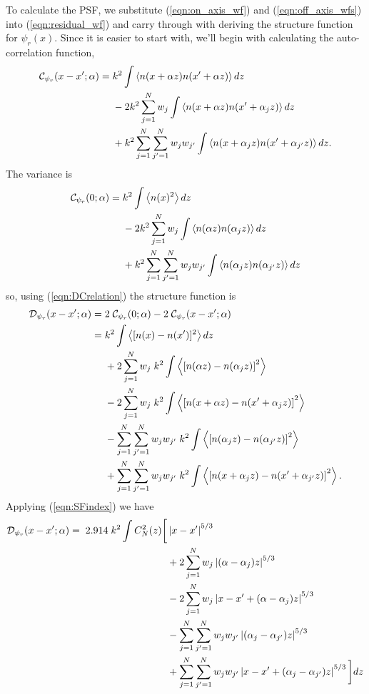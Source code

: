 \documentclass[11pt, oneside]{article}   	%
\begin{document}
To calculate the PSF, we substitute (\ref{eqn:on_axis_wf}) and (\ref{eqn:off_axis_wfs}) into (\ref{eqn:residual_wf}) and carry through with deriving the structure function for $\psi_r(x)$. Since it is easier to start with, we'll begin with calculating the auto-correlation function,
\begin{align}
\label{eqn:16}
{\cal C}_{\psi_r}(x-x';\alpha) =\; &k^2 \int \left< n(x+\alpha z) n(x'+\alpha z) \right > dz \nonumber \\
&- 2 k^2 \sum_{j=1}^N w_j \int \left < n(x+\alpha z) n(x' + \alpha_j z) \right > dz \nonumber \\ 
 &+ k^2  \sum_{j=1}^N \sum_{j'=1}^N w_j w_{j'} \int \left < n(x+\alpha_j z) n(x'+\alpha_{j'} z) \right > dz .
\end{align}
The variance is
\begin{align}
\label{eqn:variance}
{\cal C}_{\psi_r}(0;\alpha) = \;&k^2 \int \left< n(x)^2 \right > dz  \nonumber \\
&- 2 k^2 \sum_{j=1}^N w_j \int \left < n(\alpha z) n(\alpha_j z) \right > dz \nonumber \\ 
 &+ k^2  \sum_{j=1}^N \sum_{j'=1}^N  w_j w_{j'} \int \left < n(\alpha_j z) n(\alpha_{j'} z) \right > dz 
\end{align}
so, using (\ref{eqn:DCrelation}) the structure function is
\begin{align}
{\cal D}_{\psi_r}(x-x';\alpha) =\; &2\; {\cal C}_{\psi_r}(0;\alpha) - 2 \;{\cal C}_{\psi_r}(x-x';\alpha) \nonumber \\
= \;& k^2 \int \left < [n(x) - n(x')]^2 \right> dz \nonumber \\
&+ 2 \sum_{j=1}^N w_j \; k^2\int \left < \left [ n(\alpha z) - n(\alpha_{j} z) \right]^2 \right > \nonumber \\
&- 2  \sum_{j=1}^N w_j \; k^2\int \left < \left [ n(x+\alpha z) - n(x'+\alpha_{j} z) \right]^2 \right > \nonumber \\
&-   \sum_{j=1}^N \sum_{j'=1}^N w_j w_{j'} \;  k^2\int \left < \left [ n(\alpha_j z) - n(\alpha_{j'} z) \right]^2 \right > \nonumber \\
&+   \sum_{j=1}^N \sum_{j'=1}^N w_j w_{j'} \; k^2\int \left < \left [ n(x+\alpha_j z) - n(x'+\alpha_{j'} z) \right]^2 \right > .
\end{align}
Applying (\ref{eqn:SFindex}) we have
\begin{align}
\label{eqn:19}
{\cal D}_{\psi_r}(x-x';\alpha) =\; 2.914\; k^2 \int C_N^2(z) \bigg[ &\left | x - x' \right |^{5/3} \nonumber \\
&+ 2 \sum_{j=1}^N w_j \left | (\alpha - \alpha_j) z \right |^{5/3} \nonumber \\
&- 2 \sum_{j=1}^N w_j \left | x-x'+(\alpha - \alpha_j) z \right |^{5/3} \nonumber \\
&- \sum_{j=1}^N \sum_{j'=1}^N w_j w_{j'} \left | (\alpha_j - \alpha_{j'}) z \right |^{5/3}  \nonumber \\
&+ \sum_{j=1}^N \sum_{j'=1}^N w_j w_{j'} \left | x - x' + (\alpha_j - \alpha_{j'}) z \right |^{5/3} \bigg] dz
\end{align}
\end{document}
